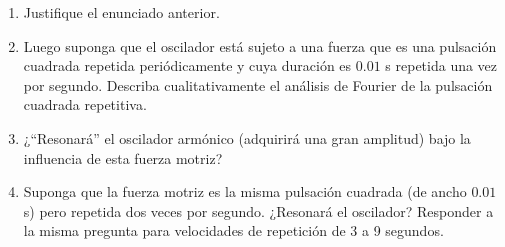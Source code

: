 \documentclass[11pt,spanish]{article}
\begin{document}
\begin{enumerate}
    \begin{enumerate}
        \item Justifique el enunciado anterior.

        \item Luego suponga que el oscilador está sujeto a una fuerza que es una
        pulsación cuadrada repetida periódicamente y cuya duración es $0.01$
        s repetida una vez por segundo. Describa cualitativamente el análisis de
        Fourier de la pulsación cuadrada repetitiva.

        \item ¿``Resonará'' el oscilador armónico (adquirirá una gran amplitud)
        bajo la influencia de esta fuerza motriz?
 
        \item Suponga que la fuerza motriz es la misma pulsación cuadrada (de
        ancho $0.01$ s) pero repetida dos veces por segundo. ¿Resonará el
        oscilador? Responder a la misma pregunta para velocidades de repetición
        de 3 a 9 segundos.
    \end{enumerate}

\end{enumerate}
\end{document}
